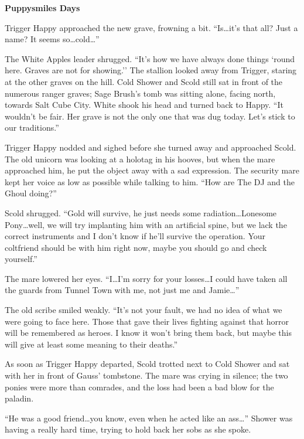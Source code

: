 \begin{center}
    \textbf{Puppysmiles Days}
\end{center}

Trigger Happy approached the new grave, frowning a bit. ``Is\dots it's that all? Just a name? It seems so\dots cold\dots''

The White Apples leader shrugged. ``It's how we have always done things `round here. Graves are not for showing.'' The stallion looked away from Trigger, staring at the other graves on the hill. Cold Shower and Scold still sat in front of the numerous ranger graves; Sage Brush's tomb was sitting alone, facing north, towards Salt Cube City. White shook his head and turned back to Happy. ``It wouldn't be fair. Her grave is not the only one that was dug today. Let's stick to our traditions.''

Trigger Happy nodded and sighed before she turned away and approached Scold. The old unicorn was looking at a holotag in his hooves, but when the mare approached him, he put the object away with a sad expression. The security mare kept her voice as low as possible while talking to him. ``How are The DJ and the Ghoul doing?''

Scold shrugged. ``Gold will survive, he just needs some radiation\dots Lonesome Pony\dots well, we will try implanting him with an artificial spine, but we lack the correct instruments and I don't know if he'll survive the operation. Your coltfriend should be with him right now, maybe you should go and check yourself.''

The mare lowered her eyes. ``I\dots I'm sorry for your losses\dots I could have taken all the guards from Tunnel Town with me, not just me and Jamie\dots''

The old scribe smiled weakly. ``It's not your fault, we had no idea of what we were going to face here. Those that gave their lives fighting against that horror will be remembered as heroes. I know it won't bring them back, but maybe this will give at least some meaning to their deaths.''

As soon as Trigger Happy departed, Scold trotted next to Cold Shower and sat with her in front of Gauss' tombstone. The mare was crying in silence; the two ponies were more than comrades, and the loss had been a bad blow for the paladin.

``He was a good friend\dots you know, even when he acted like an ass\dots'' Shower was having a really hard time, trying to hold back her sobs as she spoke.

